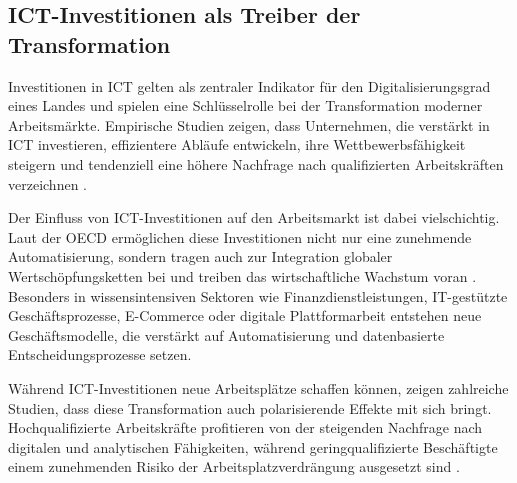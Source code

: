 
\subsection{ICT-Investitionen als Treiber der Transformation}

Investitionen in \ac{ICT} gelten als zentraler Indikator für den Digitalisierungsgrad eines 
Landes und spielen eine Schlüsselrolle bei der Transformation moderner Arbeitsmärkte. 
Empirische Studien zeigen, dass Unternehmen, die verstärkt in \ac{ICT} investieren, 
effizientere Abläufe entwickeln, ihre Wettbewerbsfähigkeit steigern 
und tendenziell eine höhere Nachfrage nach qualifizierten Arbeitskräften verzeichnen 
\parencite[vgl.][S. 30–31]{corrado2018intangible}.

Der Einfluss von \ac{ICT}-Investitionen auf den Arbeitsmarkt ist dabei vielschichtig. Laut 
der \ac{OECD} ermöglichen diese Investitionen nicht nur eine zunehmende Automatisierung, 
sondern tragen auch zur Integration globaler Wertschöpfungsketten bei und treiben das 
wirtschaftliche Wachstum voran \parencite[vgl.][S. 144]{oecd2019measuring}. Besonders 
in wissensintensiven Sektoren wie Finanzdienstleistungen, \ac{IT}-gestützte 
Geschäftsprozesse, E-Commerce oder digitale Plattformarbeit entstehen neue 
Geschäftsmodelle, die verstärkt auf Automatisierung und datenbasierte Entscheidungsprozesse 
setzen.

Während \ac{ICT}-Investitionen neue Arbeitsplätze schaffen können, zeigen zahlreiche 
Studien, dass diese Transformation auch polarisierende Effekte mit sich bringt. 
Hochqualifizierte Arbeitskräfte profitieren von der steigenden Nachfrage nach digitalen 
und analytischen Fähigkeiten, während geringqualifizierte Beschäftigte einem zunehmenden 
Risiko der Arbeitsplatzverdrängung ausgesetzt sind 
\parencite[vgl.][Kap. 2]{brynjolfsson2014thesecond}.

